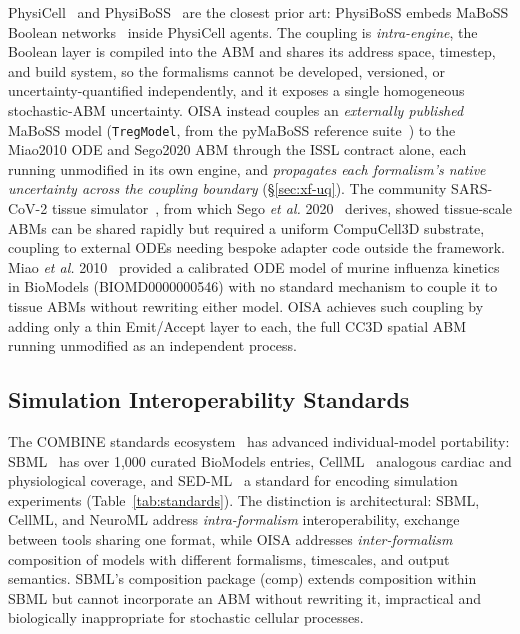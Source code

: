 \documentclass[conference,letterpaper,10pt]{IEEEtran}
\begin{document}
PhysiCell~\cite{ghaffarizadeh2018physicell} and
PhysiBoSS~\cite{ponce2023physiboss} are the closest prior art: PhysiBoSS
embeds MaBoSS Boolean networks~\cite{stoll2017maboss} inside PhysiCell
agents. The coupling is \emph{intra-engine}, the Boolean layer is compiled
into the ABM and shares its address space, timestep, and build system, so
the formalisms cannot be developed, versioned, or uncertainty-quantified
independently, and it exposes a single homogeneous stochastic-ABM
uncertainty. OISA instead couples an \emph{externally published} MaBoSS
model (\texttt{TregModel}, from the pyMaBoSS reference
suite~\cite{pymaboss}) to the Miao2010 ODE and Sego2020 ABM through the
ISSL contract alone, each running unmodified in its own engine, and
\emph{propagates each formalism's native uncertainty across the coupling
boundary} (\S\ref{sec:xf-uq}). The community SARS-CoV-2 tissue
simulator~\cite{getz2020sarscov2}, from which Sego \emph{et al.}
2020~\cite{sego2020modular} derives, showed tissue-scale ABMs can be shared
rapidly but required a uniform CompuCell3D substrate, coupling to external
ODEs needing bespoke adapter code outside the framework. Miao \emph{et al.}
2010~\cite{miao2010influenza} provided a calibrated ODE model of murine
influenza kinetics in BioModels (BIOMD0000000546) with no standard
mechanism to couple it to tissue ABMs without rewriting either model. OISA
achieves such coupling by adding only a thin Emit/Accept layer to each, the
full CC3D spatial ABM running unmodified as an independent process.

\subsection{Simulation Interoperability Standards}

The COMBINE standards ecosystem~\cite{bergmann2014combine} has advanced
individual-model portability: SBML~\cite{hucka2015sbml} has over 1{,}000
curated BioModels entries, CellML~\cite{clerx2020cellml} analogous cardiac
and physiological coverage, and SED-ML~\cite{waltemath2011sedml} a standard
for encoding simulation experiments (Table~\ref{tab:standards}). The
distinction is architectural: SBML, CellML, and NeuroML address
\emph{intra-formalism} interoperability, exchange between tools sharing one
format, while OISA addresses \emph{inter-formalism} composition of models
with different formalisms, timescales, and output semantics. SBML's
composition package (comp) extends composition within SBML but cannot
incorporate an ABM without rewriting it, impractical and biologically
inappropriate for stochastic cellular processes.
\end{document}
